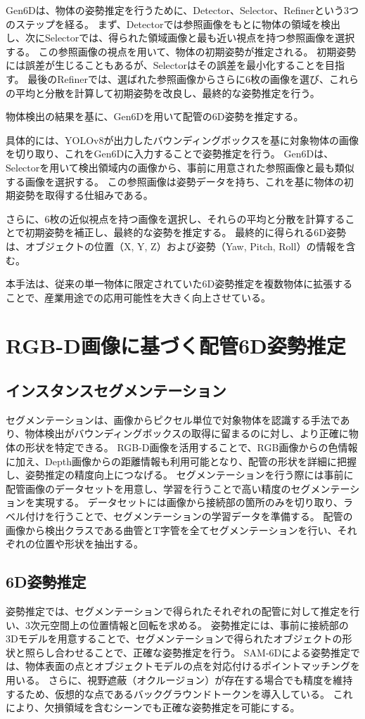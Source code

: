 Gen6Dは、物体の姿勢推定を行うために、Detector、Selector、Refinerという3つのステップを経る。
まず、Detectorでは参照画像をもとに物体の領域を検出し、次にSelectorでは、得られた領域画像と最も近い視点を持つ参照画像を選択する。
この参照画像の視点を用いて、物体の初期姿勢が推定される。
初期姿勢には誤差が生じることもあるが、Selectorはその誤差を最小化することを目指す。
最後のRefinerでは、選ばれた参照画像からさらに6枚の画像を選び、これらの平均と分散を計算して初期姿勢を改良し、最終的な姿勢推定を行う。

物体検出の結果を基に、Gen6Dを用いて配管の6D姿勢を推定する。

具体的には、YOLOv8が出力したバウンディングボックスを基に対象物体の画像を切り取り、これをGen6Dに入力することで姿勢推定を行う。
Gen6Dは、Selectorを用いて検出領域内の画像から、事前に用意された参照画像と最も類似する画像を選択する。
この参照画像は姿勢データを持ち、これを基に物体の初期姿勢を取得する仕組みである。

さらに、6枚の近似視点を持つ画像を選択し、それらの平均と分散を計算することで初期姿勢を補正し、最終的な姿勢を推定する。
最終的に得られる6D姿勢は、オブジェクトの位置（X, Y, Z）および姿勢（Yaw, Pitch, Roll）の情報を含む。

本手法は、従来の単一物体に限定されていた6D姿勢推定を複数物体に拡張することで、産業用途での応用可能性を大きく向上させている。


\section{RGB-D画像に基づく配管6D姿勢推定}
\subsection{インスタンスセグメンテーション}
セグメンテーションは、画像からピクセル単位で対象物体を認識する手法であり、物体検出がバウンディングボックスの取得に留まるのに対し、より正確に物体の形状を特定できる。
RGB-D画像を活用することで、RGB画像からの色情報に加え、Depth画像からの距離情報も利用可能となり、配管の形状を詳細に把握し、姿勢推定の精度向上につなげる。
セグメンテーションを行う際には事前に配管画像のデータセットを用意し、学習を行うことで高い精度のセグメンテーションを実現する。
データセットには画像から接続部の箇所のみを切り取り、ラベル付けを行うことで、セグメンテーションの学習データを準備する。
配管の画像から検出クラスである曲管とT字管を全てセグメンテーションを行い、それぞれの位置や形状を抽出する。

\subsection{6D姿勢推定}
姿勢推定では、セグメンテーションで得られたそれぞれの配管に対して推定を行い、3次元空間上の位置情報と回転を求める。
姿勢推定には、事前に接続部の3Dモデルを用意することで、セグメンテーションで得られたオブジェクトの形状と照らし合わせることで、正確な姿勢推定を行う。
SAM-6Dによる姿勢推定では、物体表面の点とオブジェクトモデルの点を対応付けるポイントマッチングを用いる。
さらに、視野遮蔽（オクルージョン）が存在する場合でも精度を維持するため、仮想的な点であるバックグラウンドトークンを導入している。
これにより、欠損領域を含むシーンでも正確な姿勢推定を可能にする。

